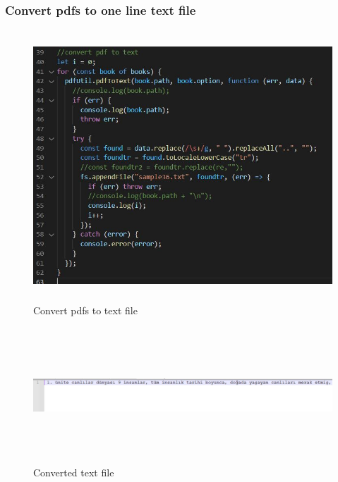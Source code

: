 \documentclass{article}
\begin{document}
\subsubsection{Convert pdfs to one line text file}
\begin{figure}[H]
    \centering
	\includegraphics[width=6in, height=4in]{4.JPG}
	\caption[Optional caption]{Convert pdfs to text file}
	\label{}
\end{figure}
\begin{figure}[H]
    \centering
	\includegraphics[width=7in, height=2in]{5.JPG}
	\caption[Optional caption]{Converted text file}
	\label{}
\end{figure}
\end{document}
